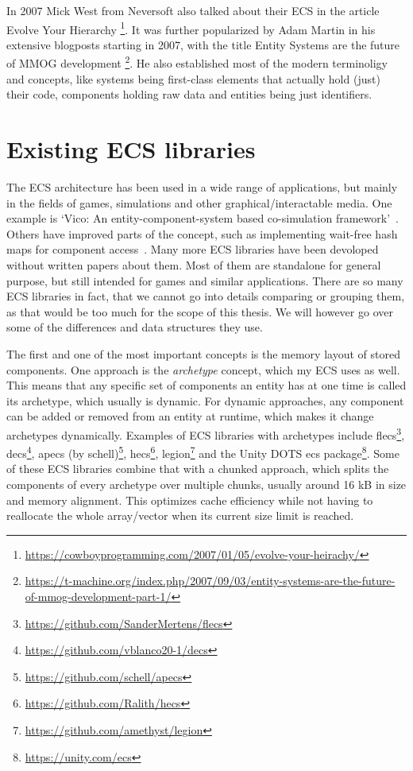 In 2007 Mick West from Neversoft also talked about their ECS in the article \textsf{Evolve Your Hierarchy} \footnote{\url{https://cowboyprogramming.com/2007/01/05/evolve-your-heirachy/}}. It was further popularized by Adam Martin in his extensive blogposts starting in 2007, with the title \textsf{Entity Systems are the future of MMOG development} \footnote{\url{https://t-machine.org/index.php/2007/09/03/entity-systems-are-the-future-of-mmog-development-part-1/}}. He also established most of the modern terminoligy and concepts, like systems being first-class elements that actually hold (just) their code, components holding raw data and entities being just identifiers.

\section{Existing ECS libraries}

The ECS architecture has been used in a wide range of applications, but mainly in the fields of games, simulations and other graphical/interactable media. One example is `Vico: An entity-component-system based co-simulation framework'~\cite{hatledal2021vico}. Others have improved parts of the concept, such as implementing wait-free hash maps for component access~\cite{lange2016wait}. Many more ECS libraries have been devoloped without written papers about them. Most of them are standalone for general purpose, but still intended for games and similar applications. There are so many ECS libraries in fact, that we cannot go into details comparing or grouping them, as that would be too much for the scope of this thesis. We will however go over some of the differences and data structures they use.

The first and one of the most important concepts is the memory layout of stored components. One approach is the \textit{archetype} concept, which my ECS uses as well. This means that any specific set of components an entity has at one time is called its archetype, which usually is dynamic. For dynamic approaches, any component can be added or removed from an entity at runtime, which makes it change archetypes dynamically. Examples of ECS libraries with archetypes include \textsf{flecs}\footnote{\url{https://github.com/SanderMertens/flecs}}, \textsf{decs}\footnote{\url{https://github.com/vblanco20-1/decs}}, \textsf{apecs} (by schell)\footnote{\url{https://github.com/schell/apecs}}, \textsf{hecs}\footnote{\url{https://github.com/Ralith/hecs}}, \textsf{legion}\footnote{\url{https://github.com/amethyst/legion}} and the Unity DOTS ecs package\footnote{\url{https://unity.com/ecs}}. Some of these ECS libraries combine that with a chunked approach, which splits the components of every archetype over multiple chunks, usually around 16 kB in size and memory alignment. This optimizes cache efficiency while not having to reallocate the whole array/vector when its current size limit is reached.

